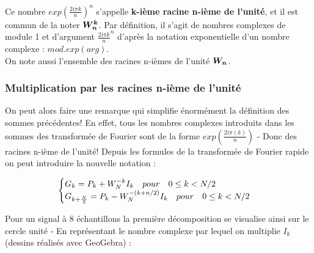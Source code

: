 \documentclass{article}
\begin{document}
\noindent Ce nombre $exp(\frac{2i\pi k}{n})^{n}$ s'appelle \textbf{k-ième racine n-ième de l'unité}, et il est commun de la noter $\bm{\krootofunity{k}{n}}$. Par définition, il s'agit de nombres complexes de module 1 et d'argument $\frac{2i\pi k}{n}^{n}$ d'après la notation exponentielle d'un nombre complexe : $mod.exp(arg)$.\\
On note aussi l'ensemble des racines n-ièmes de l'unité $\bm{\rootofunity{n}}$.

\subsubsection{Multiplication par les racines n-ième de l'unité}
On peut alors faire une remarque qui simplifie énormément la définition des sommes précédentes! En effet, tous les nombres complexes introduits dans les sommes des transformée de Fourier sont de la forme $exp(\frac{2i\pi (k)}{n})$ - Donc des racines n-ième de l'unité! Depuis les formules de la transformée de Fourier rapide on peut introduire la nouvelle notation :

\begin{equation}
	\begin{cases}
		G_{k} = P_{k} + \krootofunity{-k}{N} I_{k} \quad pour \quad 0 \leq k < N/2\\
		G_{k+\frac{N}{2}} = P_{k} - \krootofunity{-(k+n/2)}{N} I_{k} \quad pour \quad 0 \leq k < N/2
	\end{cases}
\end{equation}

\noindent Pour un signal à 8 échantillons la première décomposition se visualise ainsi sur le cercle unité - En représentant le nombre complexe par lequel on multiplie $I_{k}$ (dessins réalisés avec GeoGebra)  : 
\end{document}

